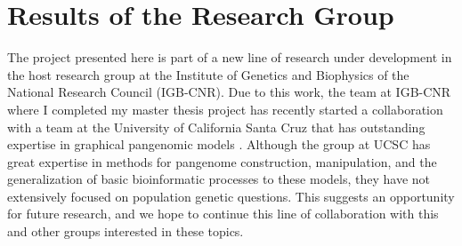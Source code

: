 \chapter{Results of the Research Group}%


The project presented here is part of a new line of research under development in the host research group at the Institute of Genetics and Biophysics of the National Research Council (IGB-CNR).
Due to this work, the team at IGB-CNR where I completed my master thesis project has recently started a collaboration \cite{eizenga2020succinct} with a team at the University of California Santa Cruz that has outstanding expertise in graphical pangenomic models \cite{garrison2019graphical,hickey2020genotyping,eizenga2020pangenome,siren2020haplotype,rhie2020towards,eizenga2020succinct,martiniano2020removing,llamas2019strategy,carletti2019graph,siren2019supplement,chin2019diploid,garrison2018variation,garg2018graph,paten2018superbubbles,computational2018computational}.
Although the group at UCSC has great expertise in methods for pangenome construction, manipulation, and the generalization of basic bioinformatic processes to these models, they have not extensively focused on population genetic questions.
This suggests an opportunity for future research, and we hope to continue this line of collaboration with this and other groups interested in these topics.

